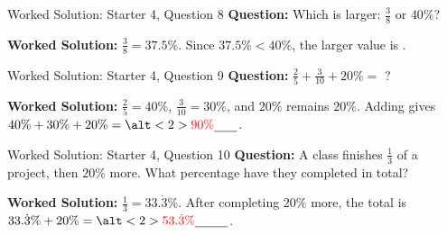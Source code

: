 \documentclass{beamer}
\newcommand{\ablank}[1]{%
  \alt<2>{\textcolor{red}{#1}}{\underline{\phantom{#1}}}%
}
\begin{document}
\begin{frame}[t]{Worked Solution: Starter 4, Question 8}
\textbf{Question:} Which is larger: \(\frac{3}{8}\) or \(40\%\)?

\smallskip
\textbf{Worked Solution:} \(\frac{3}{8} = 37.5\%\). Since \(37.5\% < 40\%\), the larger value is \ablank{$40\%$}.
\end{frame}

\begin{frame}[t]{Worked Solution: Starter 4, Question 9}
\textbf{Question:} \(\frac{2}{5} + \frac{3}{10} + 20\% =\) ?

\smallskip
\textbf{Worked Solution:} \(\frac{2}{5} = 40\%\), \(\frac{3}{10} = 30\%\), and \(20\%\) remains \(20\%\). Adding gives \(40\% + 30\% + 20\% = \ablank{90\%}\).
\end{frame}

\begin{frame}[t]{Worked Solution: Starter 4, Question 10}
\textbf{Question:} A class finishes \(\frac{1}{3}\) of a project, then \(20\%\) more. What percentage have they completed in total?

\smallskip
\textbf{Worked Solution:} \(\frac{1}{3} = 33.\dot{3}\%\). After completing \(20\%\) more, the total is \(33.\dot{3}\% + 20\% = \ablank{53.\dot{3}\%}\).
\end{frame}
\end{document}
